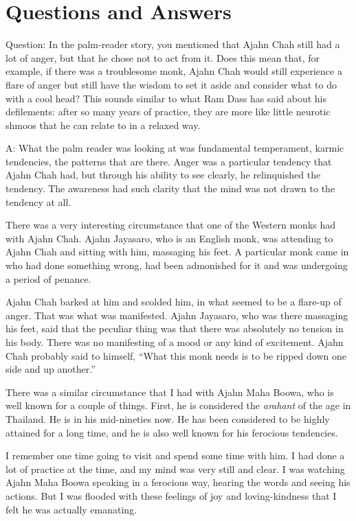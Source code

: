 \chapter{Questions and Answers}

Question: In the palm-reader story, you mentioned that Ajahn Chah still
had a lot of anger, but that he chose not to act from it. Does this mean
that, for example, if there was a troublesome monk, Ajahn Chah would
still experience a flare of anger but still have the wisdom to set it
aside and consider what to do with a cool head? This sounds similar to
what Ram Dass has said about his defilements: after so many years of
practice, they are more like little neurotic shmoos that he can relate
to in a relaxed way.

A: What the palm reader was looking at was fundamental temperament,
karmic tendencies, the patterns that are there. Anger was a particular
tendency that Ajahn Chah had, but through his ability to see clearly, he
relinquished the tendency. The awareness had such clarity that the mind
was not drawn to the tendency at all.

There was a very interesting circumstance that one of the Western monks
had with Ajahn Chah. Ajahn Jayasaro, who is an English monk, was
attending to Ajahn Chah and sitting with him, massaging his feet. A
particular monk came in who had done something wrong, had been
admonished for it and was undergoing a period of penance.

Ajahn Chah barked at him and scolded him, in what seemed to be a
flare-up of anger. That was what was manifested. Ajahn Jayasaro, who was
there massaging his feet, said that the peculiar thing was that there
was absolutely no tension in his body. There was no manifesting of a
mood or any kind of excitement. Ajahn Chah probably said to himself,
“What this monk needs is to be ripped down one side and up another.”

There was a similar circumstance that I had with Ajahn Maha Boowa, who
is well known for a couple of things. First, he is considered the
\emph{arahant} of the age in Thailand. He is in his mid-nineties now. He
has been considered to be highly attained for a long time, and he is
also well known for his ferocious tendencies.

I remember one time going to visit and spend some time with him. I had
done a lot of practice at the time, and my mind was very still and
clear. I was watching Ajahn Maha Boowa speaking in a ferocious way,
hearing the words and seeing his actions. But I was flooded with these
feelings of joy and loving-kindness that I felt he was actually
emanating.

